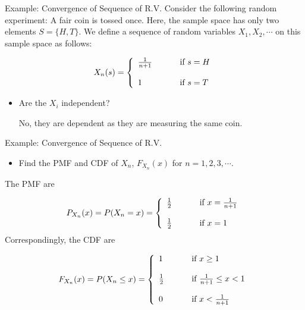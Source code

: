 \documentclass[
  ignorenonframetext,
  aspectratio=43,
]{beamer}
\providecommand{\tightlist}{%
  \setlength{\itemsep}{0pt}\setlength{\parskip}{0pt}}\usepackage{longtable,booktabs,array}
\begin{document}
\begin{frame}{Example: Convergence of Sequence of R.V.}
\label{example-convergence-of-sequence-of-r.v.}
Consider the following random experiment: A fair coin is tossed once.
Here, the sample space has only two elements \(S=\{H,T\}\). We define a
sequence of random variables \(X_1,X_2,\cdots\) on this sample space as
follows:

\[
 X_n(s) = \left\{
\begin{array}{l l}
\frac{1}{n+1} & \qquad \text{ if }s=H \\
& \qquad \\
1 & \qquad \text{ if }s=T
\end{array} \right.
\]

\begin{itemize}
\item
  Are the \(X_i\) independent?

  No, they are dependent as they are measuring the same coin.
\end{itemize}
\end{frame}

\begin{frame}{Example: Convergence of Sequence of R.V.}
\label{example-convergence-of-sequence-of-r.v.-1}
\begin{itemize}
\tightlist
\item
  Find the PMF and CDF of \(X_n\), \(F_{X_n}(x)\) for
  \(n=1,2,3,\cdots\).
\end{itemize}

The PMF are

\[
P_{{\large X_n}}(x)=P(X_n=x) = \left\{
   \begin{array}{l l}
   \frac{1}{2} & \qquad \textrm{ if }x=\frac{1}{n+1} \\
   & \qquad \\
   \frac{1}{2} & \qquad \textrm{ if }x=1
   \end{array} \right.
\] Correspondingly, the CDF are

\[
F_{{\large X_n}}(x)=P(X_n \leq x) = \left\{
\begin{array}{l l}
   1 & \qquad \textrm{ if }x \geq 1\\
   & \qquad \\
   \frac{1}{2} & \qquad \textrm{ if }\frac{1}{n+1} \leq x <1 \\
   & \qquad \\
   0 & \qquad \textrm{ if }x< \frac{1}{n+1}
   \end{array} \right.
\]
\end{frame}
\end{document}
